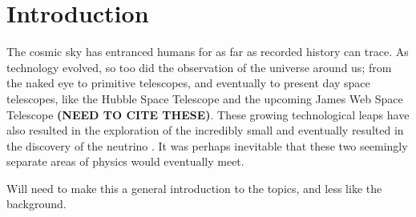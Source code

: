 \chapter{Introduction}

The cosmic sky has entranced humans for as far as recorded history can trace. As technology evolved, so too did the observation of the universe around us; from the naked eye to primitive telescopes, and eventually to present day space telescopes, like the Hubble Space Telescope and the upcoming James Web Space Telescope \textbf{(NEED TO CITE THESE)}. These growing technological leaps have also resulted in the exploration of the incredibly small and eventually resulted in the discovery of the neutrino \cite{aneut}. It was perhaps inevitable that these two seemingly separate areas of physics would eventually meet. 

Will need to make this a general introduction to the topics, and less like the background.





